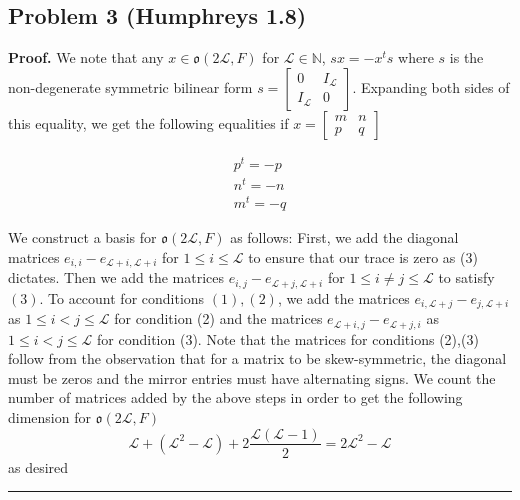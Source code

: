 \documentclass[12pt]{article}%
\newenvironment{proof}[1][Proof]{\textbf{#1.} }{\ \rule{0.5em}{0.5em}}
\begin{document}
\subsection*{Problem 3 (Humphreys 1.8)}
\begin{proof}
  We note that any $x \in \mathfrak{o}(2\mathcal{L},F)$ for $\mathcal{L} \in \mathbb{N}$, $sx = -x^ts$ where $s$ is the non-degenerate symmetric bilinear form $s = \left[ \begin{array}{ccc} 0 & I_{\mathcal{L}} \\ I_{\mathcal{L}} & 0 \end{array} \right]$. Expanding both sides of this equality, we get the following equalities if $x = \left[ \begin{array}{ccc} m & n \\ p & q \end{array} \right]$

  \begin{gather}
    p^t = -p \\
    n^t = -n \\
    m^t = -q
  \end{gather}

  We construct a basis for $\mathfrak{o}(2\mathcal{L},F)$ as follows:
  First, we add the diagonal matrices $e_{i,i} - e_{\mathcal{L}+i,\mathcal{L}+i}$ for $1 \leq i \leq \mathcal{L}$ to ensure that our trace is zero as (3) dictates. Then we add the matrices $e_{i,j} - e_{\mathcal{L} + j,\mathcal{L} + i}$ for $1 \leq i \neq j \leq \mathcal{L}$ to satisfy $(3)$. To account for conditions $(1),(2)$, we add the matrices $e_{i,\mathcal{L} +j} - e_{j,\mathcal{L} +i}$ as $1 \leq i < j \leq \mathcal{L}$ for condition (2) and the matrices $e_{\mathcal{L} +i,j} - e_{\mathcal{L} +j,i}$ as $1 \leq i < j \leq \mathcal{L}$ for condition (3). Note that the matrices for conditions (2),(3) follow from the observation that for a matrix to be skew-symmetric, the diagonal must be zeros and the mirror entries must have alternating signs. We count the number of matrices added by the above steps in order to get the following dimension for $\mathfrak{o}(2\mathcal{L},F)$
  $$ \mathcal{L} + (\mathcal{L}^2 - \mathcal{L}) + 2\frac{\mathcal{L} (\mathcal{L} -1)}{2} = 2 \mathcal{L}^2 - \mathcal{L} $$ as desired
  \end{proof}
\end{document}
